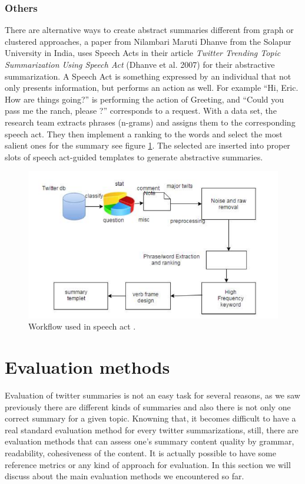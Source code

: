 \documentclass{llncs}
\begin{document}
\subsubsection{Others}

There are alternative ways to create abstract summaries different from graph or
clustered approaches, a paper from Nilambari Maruti Dhanve from the Solapur
University in India, uses Speech Acts in their article \textit{Twitter Trending
Topic Summarization Using Speech Act} (Dhanve et al.
2007) \cite{dhanve_twitter_2007} for their abstractive summarization.
A Speech Act is something expressed by an individual that not only presents
information, but performs an action as well. For example ``Hi, Eric. How are
things going?'' is performing the action of Greeting, and ``Could you pass me
the ranch, please ?'' corresponds to a request. With a data set, the research
team extracts phrases (n-grams) and assigns them to the corresponding speech
act. They then implement a ranking to the words and select the most salient
ones for the summary see figure \ref{fig:fig8}. The selected are inserted into
proper slots of speech act-guided templates to generate abstractive summaries.

\begin{figure}[H]
    \includegraphics[width=\textwidth]{fig8.png}
    \caption{Workflow used in speech act \cite{dhanve_twitter_2007}.}
    \label{fig:fig8}
\end{figure}

\section{Evaluation methods}

Evaluation of twitter summaries is not an easy task for several reasons, as we
saw previously there are different kinds of summaries and also there is not
only one correct summary for a given topic. Knowning that, it becomes
difficult to have a real standard evaluation method for every twitter
summarizations, still, there are evaluation methods that can assess one's
summary content quality by grammar, readability, cohesiveness of the content.
It is actually possible to have some reference metrics or any kind of approach
for evaluation. In this section we will discuss about the main evaluation
methods we encountered so far.
\end{document}
